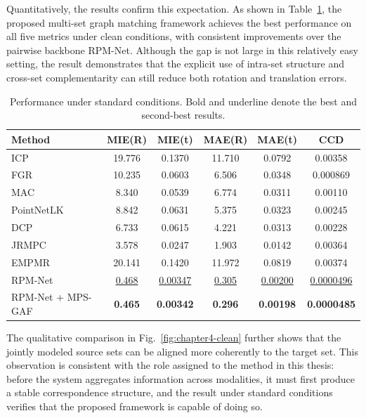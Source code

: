 Quantitatively, the results confirm this expectation. As shown in Table~\ref{tab:chapter4-clean}, the proposed multi-set graph matching framework achieves the best performance on all five metrics under clean conditions, with consistent improvements over the pairwise backbone RPM-Net. Although the gap is not large in this relatively easy setting, the result demonstrates that the explicit use of intra-set structure and cross-set complementarity can still reduce both rotation and translation errors.

\begin{table}[htb]
  \centering
  \caption{Performance under standard conditions. Bold and underline denote the best and second-best results.}
  \label{tab:chapter4-clean}
  \begin{tabular}{lccccc}
    \toprule
    Method & MIE(R) & MIE(t) & MAE(R) & MAE(t) & CCD \\
    \midrule
    ICP & 19.776 & 0.1370 & 11.710 & 0.0792 & 0.00358 \\
    FGR & 10.235 & 0.0603 & 6.506 & 0.0348 & 0.000869 \\
    MAC & 8.340 & 0.0539 & 6.774 & 0.0311 & 0.00110 \\
    PointNetLK & 8.842 & 0.0631 & 5.375 & 0.0323 & 0.00245 \\
    DCP & 6.733 & 0.0615 & 4.221 & 0.0313 & 0.00228 \\
    JRMPC & 3.578 & 0.0247 & 1.903 & 0.0142 & 0.00364 \\
    EMPMR & 20.141 & 0.1420 & 11.972 & 0.0819 & 0.00374 \\
    RPM-Net & \underline{0.468} & \underline{0.00347} & \underline{0.305} & \underline{0.00200} & \underline{0.0000496} \\
    RPM-Net + MPS-GAF & \textbf{0.465} & \textbf{0.00342} & \textbf{0.296} & \textbf{0.00198} & \textbf{0.0000485} \\
    \bottomrule
  \end{tabular}
\end{table}

The qualitative comparison in Fig.~\ref{fig:chapter4-clean} further shows that the jointly modeled source sets can be aligned more coherently to the target set. This observation is consistent with the role assigned to the method in this thesis: before the system aggregates information across modalities, it must first produce a stable correspondence structure, and the result under standard conditions verifies that the proposed framework is capable of doing so.

